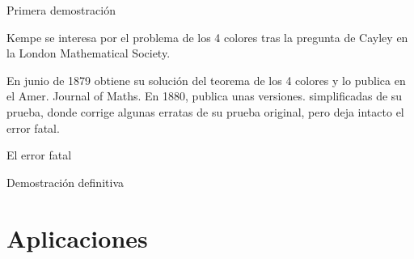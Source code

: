 \documentclass[spanish,utf8]{beamer}
\begin{document}
\begin{frame}{Primera demostración}
\begin{block}{}
Kempe se interesa por el problema de los 4 colores tras la pregunta de Cayley en la London Mathematical Society.
\end{block}

\begin{block}{}
En junio de 1879 obtiene su solución del teorema de los 4 colores y lo publica en el Amer. Journal of Maths. En 1880, publica unas versiones. simplificadas de su prueba, donde corrige algunas erratas de su prueba original, pero deja intacto el error fatal.
\end{block}
    
\end{frame}
\begin{frame}{El error fatal}
    
\end{frame}


\begin{frame}{Demostración definitiva}
    
\end{frame}
\section{Aplicaciones}
\begin{frame}{}
    
\end{frame}
\end{document}
